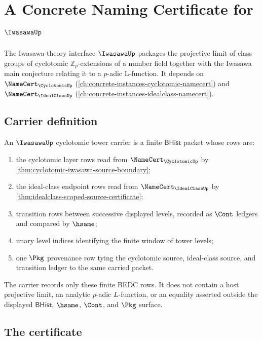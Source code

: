 \chapter{A Concrete Naming Certificate for $\IwasawaUp$}
\label{ch:concrete-instances-iwasawa-namecert}

The Iwasawa-theory interface $\IwasawaUp$ packages the projective limit of class groups of cyclotomic $\mathbb{Z}_p$-extensions of a number field together with the Iwasawa main conjecture relating it to a $p$-adic L-function. It depends on $\NameCert_{\CyclotomicUp}$ (\autoref{ch:concrete-instances-cyclotomic-namecert}) and $\NameCert_{\IdealClassUp}$ (\autoref{ch:concrete-instances-idealclass-namecert}).

\section{Carrier definition}
\label{sec:iwasawa-carrier}

\begin{definition}
\label{def:iwasawa-cyclotomic-tower-carrier}
An $\IwasawaUp$ cyclotomic tower carrier is a finite $\mathsf{BHist}$ packet
whose rows are:
\begin{enumerate}
\item the cyclotomic layer rows read from $\NameCert_{\CyclotomicUp}$ by
\autoref{thm:cyclotomic-iwasawa-source-boundary};
\item the ideal-class endpoint rows read from $\NameCert_{\IdealClassUp}$ by
\autoref{thm:idealclass-scoped-source-certificate};
\item transition rows between successive displayed levels, recorded as
$\Cont$ ledgers and compared by $\hsame$;
\item unary level indices identifying the finite window of tower levels;
\item one $\Pkg$ provenance row tying the cyclotomic source, ideal-class
source, and transition ledger to the same carried packet.
\end{enumerate}
The carrier records only these finite BEDC rows. It does not contain a host
projective limit, an analytic $p$-adic $L$-function, or an equality asserted
outside the displayed $\mathsf{BHist}$, $\hsame$, $\Cont$, and $\Pkg$ surface.
\end{definition}

\section{The certificate}
\label{sec:iwasawa-certificate}

